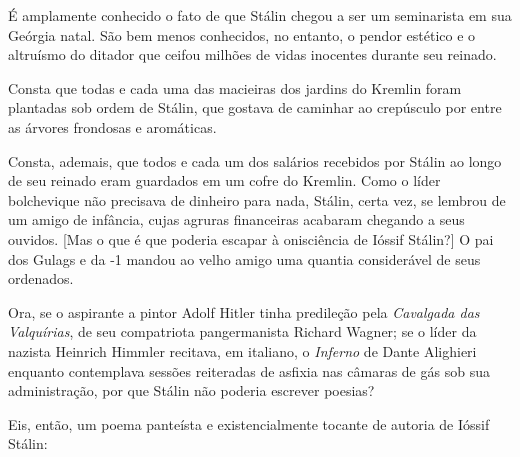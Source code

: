 É amplamente conhecido o fato de que Stálin chegou a ser um seminarista
em sua Geórgia natal. São bem menos conhecidos, no entanto, o pendor
estético e o altruísmo do ditador que ceifou milhões de vidas inocentes
durante seu reinado.

Consta que todas e cada uma das macieiras dos jardins do Kremlin foram
plantadas sob ordem de Stálin, que gostava de caminhar ao crepúsculo por
entre as árvores frondosas e aromáticas.

Consta, ademais, que todos e cada um dos salários recebidos por Stálin
ao longo de seu reinado eram guardados em um cofre do Kremlin. Como o
líder bolchevique não precisava de dinheiro para nada, Stálin, certa
vez, se lembrou de um amigo de infância, cujas agruras financeiras
acabaram chegando a seus ouvidos. {[}Mas o que é que poderia escapar à
onisciência de Ióssif Stálin?{]} O pai dos Gulags e da -1 mandou ao
velho amigo uma quantia considerável de seus ordenados.

Ora, se o aspirante a pintor Adolf Hitler tinha predileção pela
\emph{Cavalgada das Valquírias}, de seu compatriota pangermanista
Richard Wagner; se o líder da  nazista Heinrich Himmler recitava, em
italiano, o \emph{Inferno} de Dante Alighieri enquanto contemplava
sessões reiteradas de asfixia nas câmaras de gás sob sua administração,
por que Stálin não poderia escrever poesias?

Eis, então, um poema panteísta e existencialmente tocante de autoria de
Ióssif Stálin:

